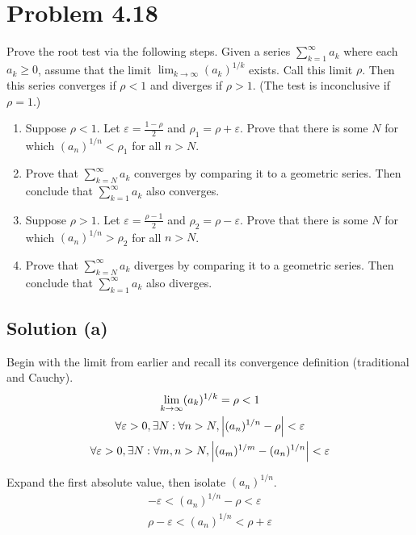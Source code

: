 \documentclass[12pt]{report}
\begin{document}
\section{Problem 4.18}
    Prove the root test via the following steps. 
    Given a series $\sum_{k=1}^{\infty} a_k$ where each $a_k \geq 0$, assume that the limit $\lim_{k \to \infty}(a_k)^{1/k}$ exists. 
    Call this limit $\rho$. 
    Then this series converges if $\rho < 1$ and  diverges if $\rho > 1$. 
    (The test is inconclusive if $\rho = 1$.)  
    \begin{enumerate}[label=(\alph*)]
        \item   Suppose $\rho < 1$. Let $\varepsilon = \frac{1 - \rho}{2}$ and $\rho_1 = \rho + \varepsilon$. Prove that there is some $N$ for which $(a_n)^{1/n} < \rho_1$ for all $n>N$.
        \item   Prove that $\sum_{k = N}^{\infty} a_k$ converges by comparing it to a geometric series. Then conclude that $\sum_{k = 1}^{\infty} a_k$ also converges. 
        \item   Suppose $\rho > 1$. Let $\varepsilon = \frac{\rho - 1}{2}$ and $\rho_2 = \rho - \varepsilon$. Prove that there is some $N$ for which $(a_n)^{1/n} > \rho_2$ for all $n>N$.
        \item   Prove that $\sum_{k = N}^{\infty} a_k$ diverges by comparing it to a geometric series. Then conclude that $\sum_{k = 1}^{\infty} a_k$ also diverges.
    \end{enumerate}

    \subsection{Solution (a)}
        Begin with the limit from earlier and recall its convergence definition (traditional and Cauchy).
        \begin{gather}
            \lim_{k \to \infty}(a_k)^{1/k} = \rho < 1\\
            \forall\varepsilon > 0, \exists N: \forall n > N, \left| (a_n)^{1/n} - \rho \right| < \varepsilon\\
            \forall\varepsilon > 0, \exists N: \forall m, n > N, \left| (a_m)^{1/m} - (a_n)^{1/n} \right| < \varepsilon
        \end{gather}

        Expand the first absolute value, then isolate $(a_n)^{1/n}$.
        \begin{gather}
            -\varepsilon < (a_n)^{1/n} - \rho < \varepsilon\\
            \rho - \varepsilon < (a_n)^{1/n} < \rho + \varepsilon
        \end{gather}
    \pagebreak
\end{document}
